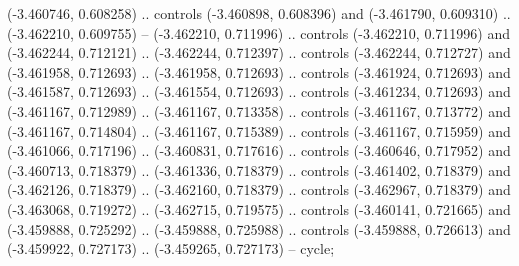     (-3.460746, 0.608258) .. controls (-3.460898, 0.608396) and (-3.461790, 0.609310) ..
    (-3.462210, 0.609755) --
    (-3.462210, 0.711996) .. controls (-3.462210, 0.711996) and (-3.462244, 0.712121) ..
    (-3.462244, 0.712397) .. controls (-3.462244, 0.712727) and (-3.461958, 0.712693) ..
    (-3.461958, 0.712693) .. controls (-3.461924, 0.712693) and (-3.461587, 0.712693) ..
    (-3.461554, 0.712693) .. controls (-3.461234, 0.712693) and (-3.461167, 0.712989) ..
    (-3.461167, 0.713358) .. controls (-3.461167, 0.713772) and (-3.461167, 0.714804) ..
    (-3.461167, 0.715389) .. controls (-3.461167, 0.715959) and (-3.461066, 0.717196) ..
    (-3.460831, 0.717616) .. controls (-3.460646, 0.717952) and (-3.460713, 0.718379) ..
    (-3.461336, 0.718379) .. controls (-3.461402, 0.718379) and (-3.462126, 0.718379) ..
    (-3.462160, 0.718379) .. controls (-3.462967, 0.718379) and (-3.463068, 0.719272) ..
    (-3.462715, 0.719575) .. controls (-3.460141, 0.721665) and (-3.459888, 0.725292) ..
    (-3.459888, 0.725988) .. controls (-3.459888, 0.726613) and (-3.459922, 0.727173) ..
    (-3.459265, 0.727173) --
    cycle;

